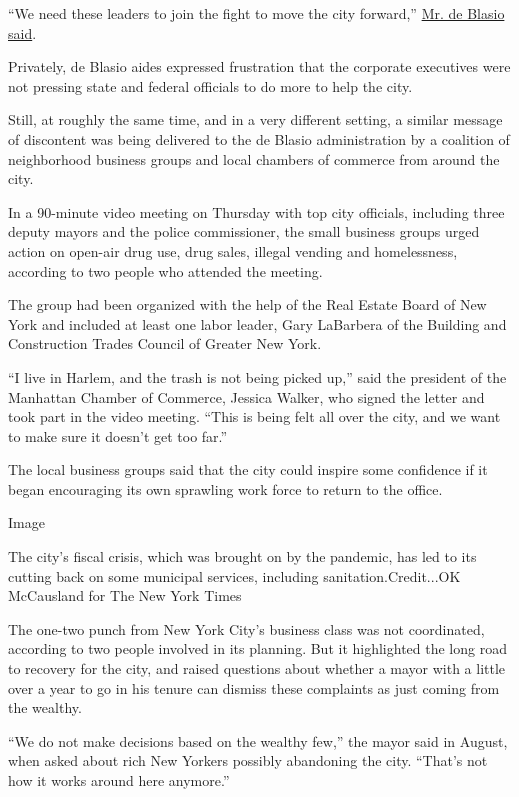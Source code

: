 ``We need these leaders to join the fight to move the city forward,''
\href{https://twitter.com/NYCMayor/status/1304161101458833409}{Mr. de
Blasio said}.

Privately, de Blasio aides expressed frustration that the corporate
executives were not pressing state and federal officials to do more to
help the city.

Still, at roughly the same time, and in a very different setting, a
similar message of discontent was being delivered to the de Blasio
administration by a coalition of neighborhood business groups and local
chambers of commerce from around the city.

In a 90-minute video meeting on Thursday with top city officials,
including three deputy mayors and the police commissioner, the small
business groups urged action on open-air drug use, drug sales, illegal
vending and homelessness, according to two people who attended the
meeting.

The group had been organized with the help of the Real Estate Board of
New York and included at least one labor leader, Gary LaBarbera of the
Building and Construction Trades Council of Greater New York.

``I live in Harlem, and the trash is not being picked up,'' said the
president of the Manhattan Chamber of Commerce, Jessica Walker, who
signed the letter and took part in the video meeting. ``This is being
felt all over the city, and we want to make sure it doesn't get too
far.''

The local business groups said that the city could inspire some
confidence if it began encouraging its own sprawling work force to
return to the office.

Image

The city's fiscal crisis, which was brought on by the pandemic, has led
to its cutting back on some municipal services, including
sanitation.Credit...OK McCausland for The New York Times

The one-two punch from New York City's business class was not
coordinated, according to two people involved in its planning. But it
highlighted the long road to recovery for the city, and raised questions
about whether a mayor with a little over a year to go in his tenure can
dismiss these complaints as just coming from the wealthy.

``We do not make decisions based on the wealthy few,'' the mayor said in
August, when asked about rich New Yorkers possibly abandoning the city.
``That's not how it works around here anymore.''

